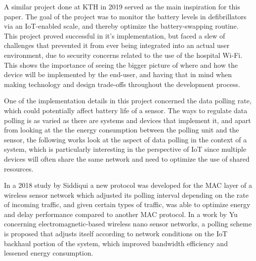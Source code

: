 A similar project done at KTH in 2019 served as the main inspiration for this paper.\cite{hospital} The goal of the project was to monitor the battery levels in defibrillators via an IoT-enabled scale, and thereby optimize the battery-swapping routine. This project proved successful in it's implementation, but faced a slew of challenges that prevented it from ever being integrated into an actual user environment, due to security concerns related to the use of the hospital Wi-Fi. This shows the importance of seeing the bigger picture of where and how the device will be implemented by the end-user, and having that in mind when making technology and design trade-offs throughout the development process.

One of the implementation details in this project concerned the data polling rate, which could potentially affect battery life of a sensor. The ways to regulate data polling is as varied as there are systems and devices that implement it, and apart from looking at the the energy consumption between the polling unit and the sensor, the following works look at the aspect of data polling in the context of a system, which is particularly interesting in the perspective of IoT since multiple devices will often share the same network and need to optimize the use of shared resources.

In a 2018 study by Siddiqui \etal \cite{ADP-MAC} a new protocol was developed for the MAC layer of a wireless sensor network which adjusted its polling interval depending on the rate of incoming traffic, and given certain types of traffic, was able to optimize energy and delay performance compared to another MAC protocol. 
In a work by Yu \etal concerning electromagnetic-based wireless nano sensor networks, a polling scheme is proposed that adjusts itself according to network conditions on the IoT backhaul portion of the system, which improved bandwidth efficiency and lessened energy consumption. 

